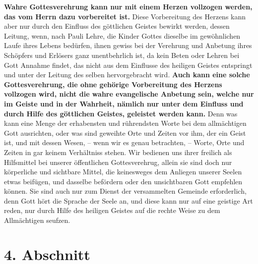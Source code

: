 \label{ref:06_03_gottesdiensvorbereitung}
 \textbf{Wahre
Gottesverehrung kann nur mit einem Herzen vollzogen werden, das vom Herrn
dazu vorbereitet ist.} Diese Vorbereitung des Herzens kann aber nur
durch den Einfluss des göttlichen Geistes bewirkt werden, dessen Leitung, wenn,
nach Pauli Lehre, die Kinder Gottes dieselbe im gewöhnlichen Laufe ihres Lebens
bedürfen, ihnen gewiss bei der Verehrung und Anbetung ihres Schöpfers und
Erlösers ganz unentbehrlich ist, da kein Beten oder Lehren bei Gott Annahme
findet,
das nicht aus dem Einflusse des
heiligen Geistes entspringt und unter der Leitung des selben hervorgebracht
wird. \textbf{Auch kann eine solche Gottesverehrung,
die ohne
gehörige Vorbereitung des Herzens vollzogen wird, nicht die wahre evangelische
Anbetung sein, welche nur im Geiste und in der Wahrheit, nämlich nur unter dem
Einfluss und durch Hilfe des göttlichen Geistes, geleistet werden
kann.} Denn was kann eine Menge der
erhabensten und rührendsten Worte bei dem
allmächtigen Gott ausrichten, oder was sind geweihte Orte und Zeiten vor
ihm, der ein Geist ist, und mit dessen Wesen, -- wenn wir es genau betrachten,
-- Worte, Orte und Zeiten in gar keinem Verhältniss stehen. Wir bedienen uns
ihrer freilich als Hilfsmittel bei unserer öffentlichen Gottesverehrug, allein
sie sind doch nur körperliche und sichtbare Mittel, die keinesweges dem Anliegen
unserer
Seelen etwas beifügen, und dasselbe befördern oder den unsichtbaren Gott
empfehlen können. Sie sind auch nur
zum Dienst der versammelten Gemeinde erforderlich, denn
Gott hört die Sprache
der Seele an, und diese kann
nur auf eine geistige Art reden, nur durch
Hilfe des heiligen Geistes auf die
rechte Weise zu dem Allmächtigen seufzen.

\section{4. Abschnitt} \label{kap6_ab4}

